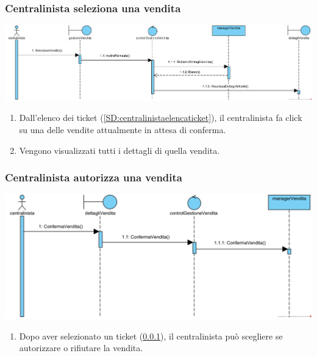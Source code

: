 \documentclass[12pt,a4paper]{article}
\begin{document}
\subsubsection{Centralinista seleziona una vendita}
\label{SD:selezionevenditacentralinista}

\begin{center}
\includegraphics[width=\textwidth]{SequenceDiagram/CentralinistaSelezionaVendita}
\end{center}

\begin{enumerate}
\item Dall'elenco dei ticket (\ref{SD:centralinistaelencaticket}), il centralinista fa click su una delle vendite attualmente in attesa di conferma.
\item Vengono visualizzati tutti i dettagli di quella vendita.
\end{enumerate}

\subsubsection{Centralinista autorizza una vendita}
\label{SD:centralinistaautorizza}
\begin{center}
\includegraphics[width=\textwidth]{SequenceDiagram/CentralinistaAutorizzaVendita}
\end{center}

\begin{enumerate}
\item Dopo aver selezionato un ticket (\ref{SD:selezionevenditacentralinista}), il centralinista può scegliere se autorizzare o rifiutare la vendita.
\end{enumerate}
\end{document}
